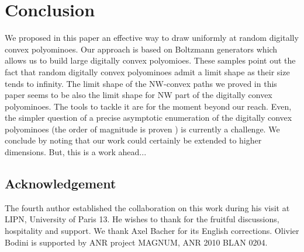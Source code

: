 \documentclass{article}
\begin{document}
\section*{Conclusion}
We proposed in this paper an effective way to draw uniformly at random
digitally convex polyominoes. Our approach is based on Boltzmann
generators which allows us to build large digitally convex polyomioes.
These samples
point out the fact that random digitally convex polyominoes admit a
limit shape as their size tends to infinity. The limit shape of the NW-convex paths we proved in this paper seems to be also 
the limit shape for NW part of the digitally convex polyominoes. The tools to
tackle it are for the moment beyond our reach. 
Even, the simpler question of a precise asymptotic enumeration of the digitally convex polyominoes
 (the order of magnitude is proven \cite{IvKoZu94}) is currently a challenge. We conclude by noting that our
work could certainly be extended to higher dimensions. But, this is a
work ahead...
\subsection*{Acknowledgement}
The fourth author established the collaboration on this work during his visit at
LIPN, University of Paris 13. He wishes to thank for the fruitful discussions, hospitality and
support.
We thank Axel Bacher for its English corrections.
Olivier Bodini is supported by ANR project MAGNUM, ANR 2010 BLAN 0204.

\newpage



\end{document}

